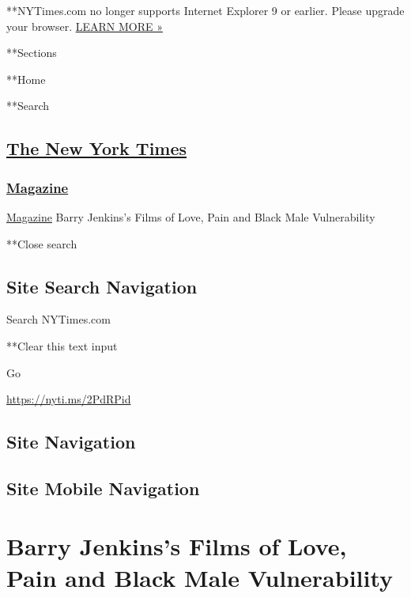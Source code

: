  **NYTimes.com no longer supports Internet Explorer 9 or earlier. Please
upgrade your browser.
\href{http://www.nytimes3xbfgragh.onion/content/help/site/ie9-support.html}{LEARN
MORE »}

**Sections

**Home

**Search

\hypertarget{the-new-york-times}{%
\subsection{\texorpdfstring{\href{http://www.nytimes3xbfgragh.onion/}{The
New York Times}}{The New York Times}}\label{the-new-york-times}}

\hypertarget{-magazine-}{%
\subsubsection{\texorpdfstring{
\href{https://www.nytimes3xbfgragh.onion/section/magazine}{Magazine}
}{ Magazine }}\label{-magazine-}}

 \href{https://www.nytimes3xbfgragh.onion/section/magazine}{Magazine}
\textbar{}Barry Jenkins's Films of Love, Pain and Black Male
Vulnerability

**Close search

\hypertarget{site-search-navigation}{%
\subsection{Site Search Navigation}\label{site-search-navigation}}

Search NYTimes.com

**Clear this text input

Go

\url{https://nyti.ms/2PdRPid}

\hypertarget{site-navigation}{%
\subsection{Site Navigation}\label{site-navigation}}

\hypertarget{site-mobile-navigation}{%
\subsection{Site Mobile Navigation}\label{site-mobile-navigation}}

\hypertarget{barry-jenkinss-films-of-love-pain-and-black-male-vulnerability}{%
\section{Barry Jenkins's Films of Love, Pain and Black Male
Vulnerability}\label{barry-jenkinss-films-of-love-pain-and-black-male-vulnerability}}

